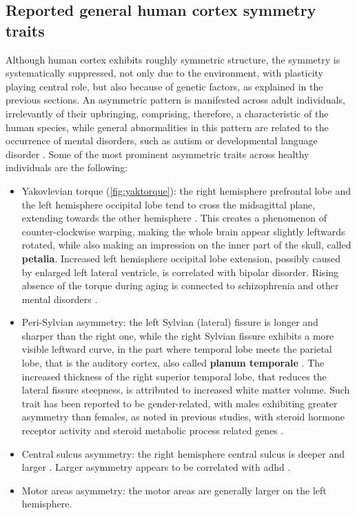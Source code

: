 \subsection{Reported general human cortex symmetry traits}
Although human cortex exhibits roughly symmetric structure, the symmetry is systematically suppressed, not only due to the environment, with plasticity playing central role, but also because of genetic factors, as explained in the previous sections. An asymmetric pattern is manifested across adult individuals, irrelevantly of their upbringing, comprising, therefore, a characteristic of the human species, while general abnormalities in this pattern are related to the occurrence of mental disorders, such as autism or developmental language disorder \cite{Herbert2005}\cite{Kong2022}. Some of the most prominent asymmetric traits across healthy individuals are the following:
\begin{itemize}
	\item{Yakovlevian torque (\autoref{fig:yaktorque}): the right hemisphere prefrontal lobe and the left hemisphere occipital lobe tend to cross the midsagittal plane, extending towards the other hemisphere \cite{Kuo2022}. This creates a phenomenon of counter-clockwise warping, making the whole brain appear slightly leftwards rotated, while also making an impression on the inner part of the skull, called \textbf{petalia}. Increased left hemisphere occipital lobe extension, possibly caused by enlarged left lateral ventricle, is correlated with bipolar disorder\cite{Maller2015}. Rising absence of the torque during aging is connected to schizophrenia  and other mental disorders \cite{Ribolsi2014}.}
	\item{Peri-Sylvian asymmetry: the left Sylvian (lateral) fissure is longer and sharper than the right one, while the right Sylvian fissure exhibits a more visible leftward curve, in the part where temporal lobe meets the parietal lobe, that is the auditory cortex, also called \textbf{planum temporale} \cite{Kuo2022}. The increased thickness of the right superior temporal lobe, that reduces the lateral fissure steepness, is attributed to increased white matter volume. Such trait has been reported to be gender-related, with males exhibiting greater asymmetry than females, as noted in previous studies, with steroid hormone receptor activity and steroid metabolic process related genes \cite{Guadalupe2015}.}
	\item{Central sulcus asymmetry: the right hemisphere central sulcus is deeper and larger \cite{Kuo2022}. Larger asymmetry appears to be correlated with \ac{adhd} \cite{Li2015}.}
	\item{Motor areas asymmetry: the motor areas are generally larger on the left hemisphere.}
\end{itemize}

